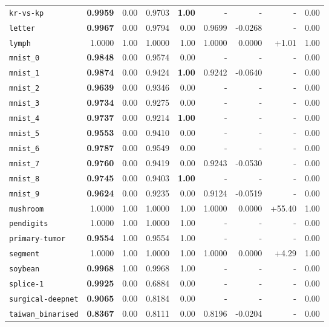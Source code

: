 \begin{tabular}{lrrrrrrrr}
\texttt{kr-vs-kp} & \textbf{0.9959} & 0.00 & 0.9703 & \textbf{1.00} & - & - & - & 0.00\\
\texttt{letter} & \textbf{0.9967} & 0.00 & 0.9794 & 0.00 & 0.9699 & -0.0268 & - & 0.00\\
\texttt{lymph} & 1.0000 & 1.00 & 1.0000 & 1.00 & 1.0000 & 0.0000 & +1.01 & 1.00\\
\texttt{mnist\_0} & \textbf{0.9848} & 0.00 & 0.9574 & 0.00 & - & - & - & 0.00\\
\texttt{mnist\_1} & \textbf{0.9874} & 0.00 & 0.9424 & \textbf{1.00} & 0.9242 & -0.0640 & - & 0.00\\
\texttt{mnist\_2} & \textbf{0.9639} & 0.00 & 0.9346 & 0.00 & - & - & - & 0.00\\
\texttt{mnist\_3} & \textbf{0.9734} & 0.00 & 0.9275 & 0.00 & - & - & - & 0.00\\
\texttt{mnist\_4} & \textbf{0.9737} & 0.00 & 0.9214 & \textbf{1.00} & - & - & - & 0.00\\
\texttt{mnist\_5} & \textbf{0.9553} & 0.00 & 0.9410 & 0.00 & - & - & - & 0.00\\
\texttt{mnist\_6} & \textbf{0.9787} & 0.00 & 0.9549 & 0.00 & - & - & - & 0.00\\
\texttt{mnist\_7} & \textbf{0.9760} & 0.00 & 0.9419 & 0.00 & 0.9243 & -0.0530 & - & 0.00\\
\texttt{mnist\_8} & \textbf{0.9745} & 0.00 & 0.9403 & \textbf{1.00} & - & - & - & 0.00\\
\texttt{mnist\_9} & \textbf{0.9624} & 0.00 & 0.9235 & 0.00 & 0.9124 & -0.0519 & - & 0.00\\
\texttt{mushroom} & 1.0000 & 1.00 & 1.0000 & 1.00 & 1.0000 & 0.0000 & +55.40 & 1.00\\
\texttt{pendigits} & 1.0000 & 1.00 & 1.0000 & 1.00 & - & - & - & 0.00\\
\texttt{primary-tumor} & \textbf{0.9554} & 1.00 & 0.9554 & 1.00 & - & - & - & 0.00\\
\texttt{segment} & 1.0000 & 1.00 & 1.0000 & 1.00 & 1.0000 & 0.0000 & +4.29 & 1.00\\
\texttt{soybean} & \textbf{0.9968} & 1.00 & 0.9968 & 1.00 & - & - & - & 0.00\\
\texttt{splice-1} & \textbf{0.9925} & 0.00 & 0.6884 & 0.00 & - & - & - & 0.00\\
\texttt{surgical-deepnet} & \textbf{0.9065} & 0.00 & 0.8184 & 0.00 & - & - & - & 0.00\\
\texttt{taiwan\_binarised} & \textbf{0.8367} & 0.00 & 0.8111 & 0.00 & 0.8196 & -0.0204 & - & 0.00\\

\end{tabular}
